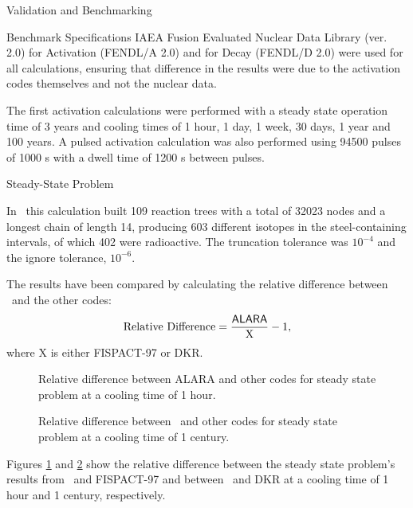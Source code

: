 \begin{chapter}{Validation and Benchmarking\label{chap:valid}}
\begin{section}{Benchmark Specifications}
    IAEA Fusion Evaluated Nuclear Data Library (ver. 2.0) for
    Activation (FENDL/A 2.0) and for Decay (FENDL/D 2.0) were used for
    all calculations, ensuring that difference in the results were due
    to the activation codes themselves and not the nuclear data.
    
    The first activation calculations were performed with a steady
    state operation time of 3 years and cooling times of 1 hour, 1
    day, 1 week, 30 days, 1 year and 100 years.  A pulsed activation
    calculation was also performed using 94500 pulses of 1000 s with a
    dwell time of 1200 s between pulses.
  \end{section}
  
  \begin{section}{Steady-State Problem}
    
    In \ALARA\, this calculation built 109 reaction trees with a total
    of 32023 nodes and a longest chain of length 14, producing 603
    different isotopes in the steel-containing intervals, of which 402
    were radioactive.  The truncation tolerance was $10^{-4}$ and the
    ignore tolerance, $10^{-6}$.
    
    The results have been compared by calculating the relative
    difference between \ALARA\ and the other codes:
    $$\mbox{Relative Difference} = \frac{\mbox{\textsf{ALARA}}}{\mbox{X}} - 1,$$
    where X is either FISPACT-97 or DKR.  
    
    \begin{figure}[htbp]
      \begin{center}
        \caption{Relative difference between ALARA and other codes for
          steady state problem at a cooling time of 1 hour.}
        \label{fig:rel.diff.ss.1}
      \end{center}
    \end{figure}
    
    \begin{figure}[htbp]
      \begin{center}
        \caption{Relative difference between \ALARA\  and other codes for
          steady state problem at a cooling time of 1 century.}
        \label{fig:rel.diff.ss.2}
      \end{center}
    \end{figure}
    
    Figures \ref{fig:rel.diff.ss.1} and \ref{fig:rel.diff.ss.2} show
    the relative difference between the steady state problem's results
    from \ALARA\ and FISPACT-97 and between \ALARA\ and DKR at a
    cooling time of 1 hour and 1 century, respectively.
    

\end{section}
\end{chapter}
